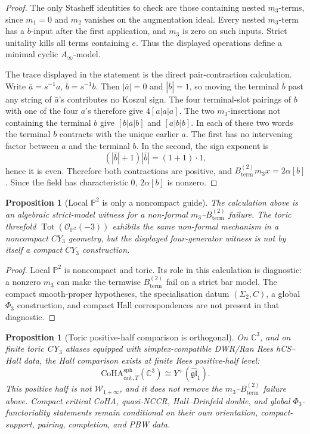 \documentclass[11pt]{amsart}
\providecommand{\Ainf}{A_\infty}
\providecommand{\CoHA}{\mathrm{CoHA}}
\newtheorem{proposition}[theorem]{Proposition}
\theoremstyle{definition}
\theoremstyle{remark}
\begin{document}
\begin{proof}
The only Stasheff identities to check are those containing nested
\(m_3\)-terms, since \(m_1=0\) and \(m_2\) vanishes on the augmentation
ideal.  Every nested \(m_3\)-term has a \(b\)-input after the first
application, and \(m_3\) is zero on such inputs.  Strict unitality kills
all terms containing \(e\).  Thus the displayed operations define a
minimal cyclic \(\Ainf\)-model.

The trace displayed in the statement is the direct pair-contraction
calculation.  Write \(\bar a=s^{-1}a\), \(\bar b=s^{-1}b\).  Then
\(|\bar a|=0\) and \(|\bar b|=1\), so moving the terminal \(\bar b\) past any
string of \(\bar a\)'s contributes no Koszul sign.  The four terminal-slot
pairings of \(b\) with one of the four \(a\)'s therefore give
\(4[a|a|a]\).  The two \(m_3\)-insertions not containing the terminal \(b\)
give \([b|a|b]\) and \([a|b|b]\).  In each of these two words the terminal
\(b\) contracts with the unique earlier \(a\).  The first has no intervening
factor between \(a\) and the terminal \(b\).  In the second, the sign
exponent is
\[
        (|\bar b|+1)|\bar b|=(1+1)\cdot 1,
\]
hence it is even.  Therefore both contractions are positive, and
\(B^{(2)}_{\mathrm{term}}m_3x=2\alpha[b]\).  Since the field has
characteristic \(0\), \(2\alpha[b]\) is nonzero.
\end{proof}

\begin{proposition}[Local \(\mathbb P^2\) is only a noncompact guide]
The calculation above is an algebraic strict-model witness for a non-formal
\(m_3\)--\(B^{(2)}_{\mathrm{term}}\) failure.  The toric threefold
\(\operatorname{Tot}(\mathcal O_{\mathbb P^2}(-3))\) exhibits the same
non-formal mechanism in a noncompact \(CY_3\) geometry, but the displayed
four-generator witness is not by itself a compact \(CY_3\) construction.
\end{proposition}

\begin{proof}
Local \(\mathbb P^2\) is noncompact and toric.  Its role in this calculation
is diagnostic: a nonzero \(m_3\) can make the termwise
\(B^{(2)}_{\mathrm{term}}\) fail on a strict bar model.  The compact
smooth-proper hypotheses, the specialisation datum \((\Sigma_2,C)\), a global
\(\Phi_3\) construction, and compact Hall correspondences are not present in
that diagnostic.
\end{proof}

\begin{proposition}[Toric positive-half comparison is orthogonal]
On \(\mathbb C^3\), and on finite toric CY$_3$ atlases equipped with
simplex-compatible DWR/Ran Rees hCS--Hall data, the Hall comparison exists
at finite Rees positive-half level:
\[
        \CoHA^{\mathrm{sph}}_{\mathrm{crit},T}(\mathbb C^3)
        \cong
        Y^+(\widehat{\mathfrak{gl}}_1).
\]
This positive half is not \(\mathcal W_{1+\infty}\), and it does not
remove the \(m_3\)--\(B^{(2)}_{\mathrm{term}}\) failure above. Compact
critical CoHA, quasi-NCCR, Hall--Drinfeld double, and global
\(\Phi_3\)-functoriality statements remain conditional on their own
orientation, compact-support, pairing, completion, and PBW data.
\end{proposition}
\end{document}
